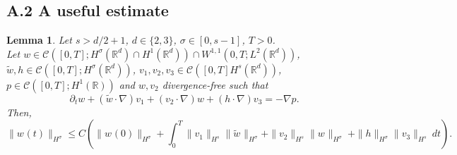 \documentclass{amsart}
\newtheorem{lemma}{Lemma}
\begin{document}
\subsection*{A.2 A useful estimate}
\label{subsection: USeful estimates}
\begin{lemma}
    \label{lemma: Besov l}
Let $s>d/2+1$, $d\in\{2,3\}$, $\sigma\in [0,s-1]$, $T>0$.\\ Let $w \in \mathcal{C}([0,T];H^{\sigma}(\mathbb{R}^d)\cap H^1(\mathbb{R}^d))\cap W^{1,1}(0,T;L^2(\mathbb{R}^d))$, $\tilde{w}, h \in \mathcal{C}([0,T];H^{\sigma}(\mathbb{R}^d))$, $v_1,v_2,v_3 \in \mathcal{C}([0,T]H^s(\mathbb{R}^d))$, $p\in \mathcal{C}([0,T];H^1(\mathbb{R}))$ and $w, v_2$ divergence-free such that
\begin{equation}
\label{eq: A4}
    \partial_t w + (\tilde{w} \cdot \nabla) v_1 + (v_2 \cdot \nabla) w +  (h \cdot \nabla) v_3 = -\nabla p.
\end{equation}
Then,
$$ \|w^{}(t)\|_{H^{\sigma}_{}} \leq C \left( \|w^{}(0)\|_{H^{\sigma}_{}} + \int_0^T \| v_1\|_{H^s} \|\tilde{w}^{} \|_{H^{\sigma}} + \|v_2\|_{H^s}  \|w^{} \|_{H^{\sigma}}  \ + \|h\|_{H^{\sigma}} \|v_3\|_{H^s}\ dt\right).$$
\end{lemma}
\end{document}
